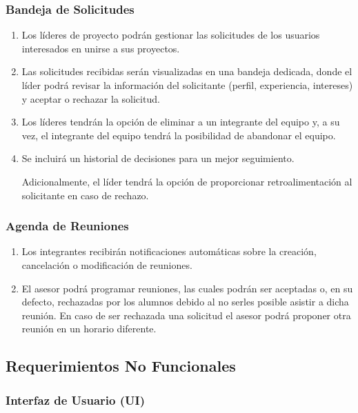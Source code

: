 	\subsubsection{Bandeja de Solicitudes}

	\begin{enumerate}
		\item Los líderes de proyecto podrán gestionar las solicitudes de los usuarios
			interesados en unirse a sus proyectos.

		\item Las solicitudes recibidas serán visualizadas en una bandeja dedicada,
			donde el líder podrá revisar la información del solicitante (perfil,
			experiencia, intereses) y aceptar o rechazar la solicitud.

		\item Los líderes tendrán la opción de eliminar a un integrante del equipo y,
			a su vez, el integrante del equipo tendrá la posibilidad de abandonar el equipo.

		\item Se incluirá un historial de decisiones para un mejor seguimiento.

			Adicionalmente, el líder tendrá la opción de proporcionar retroalimentación
			al solicitante en caso de rechazo.
	\end{enumerate}

	\subsubsection{Agenda de Reuniones}

	\begin{enumerate}
		\item Los integrantes recibirán notificaciones automáticas sobre la creación,
			cancelación o modificación de reuniones.

		\item El asesor podrá programar reuniones, las cuales podrán ser aceptadas o, en
			su defecto, rechazadas por los alumnos debido al no serles posible asistir a
			dicha reunión. En caso de ser rechazada una solicitud el asesor podrá proponer
			otra reunión en un horario diferente.
	\end{enumerate}

	\subsection{Requerimientos No Funcionales}

	\subsubsection{Interfaz de Usuario (UI)}

